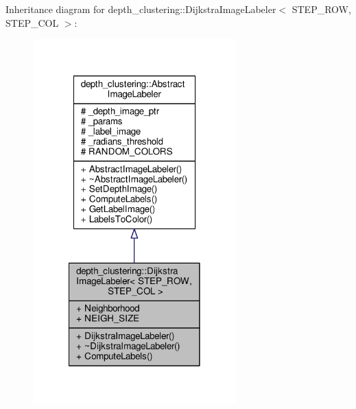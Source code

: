 Inheritance diagram for depth\-\_\-clustering\-:\-:Dijkstra\-Image\-Labeler$<$ S\-T\-E\-P\-\_\-\-R\-O\-W, S\-T\-E\-P\-\_\-\-C\-O\-L $>$\-:
\nopagebreak
\begin{figure}[H]
\begin{center}
\leavevmode
\includegraphics[width=222pt]{classdepth__clustering_1_1DijkstraImageLabeler__inherit__graph}
\end{center}
\end{figure}


